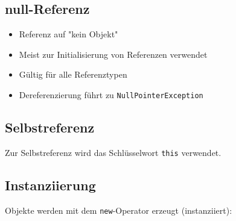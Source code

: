 \begin{minipage}[t]{0.41\columnwidth}
    \subsection{\textsf{\textbf{\textcolor{keywordcolour}{null}}}-Referenz}
    \raggedright%
    \begin{itemize}
        \item Referenz auf "kein Objekt"
        \item Meist zur Initialisierung von Referenzen verwendet
        \item Gültig für alle Referenztypen
        \item Dereferenzierung führt zu \lstinline{NullPointerException}
    \end{itemize}
\end{minipage}\hfill%
\begin{minipage}[t]{0.59\columnwidth}
    \raggedright%
    \subsection{Selbstreferenz}
    Zur Selbstreferenz wird das Schlüsselwort \lstinline{this} verwendet.
    
    \subsection{Instanziierung}
    Objekte werden mit dem \lstinline{new}-Operator erzeugt (instanziiert): 
\end{minipage}

